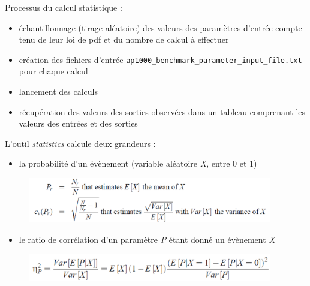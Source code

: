\begin{frame}[fragile]


Processus du calcul statistique : 
\begin{itemize}
    \item échantillonnage (tirage aléatoire) des valeurs des paramètres d'entrée compte tenu de leur loi de pdf et du nombre de calcul à effectuer
    \item création des fichiers d'entrée \texttt{ap1000\_benchmark\_parameter\_input\_file.txt} pour chaque calcul
    \item lancement des calculs
    \item récupération des valeurs des sorties observées dans un tableau comprenant les valeurs des entrées et des sorties
\end{itemize}



\end{frame}


\begin{frame}[fragile]
L'outil \textit{statistics} calcule deux grandeurs :
\begin{itemize}
    \item la probabilité d'un évènement (variable aléatoire \textit{X}, entre 0 et 1)
\end{itemize}
\begin{figure}
\centering \includegraphics[width=0.95\textwidth]{Figures/Stat_EventProba.png} 
\end{figure}

\begin{itemize}
    \item le ratio de corrélation d'un paramètre \textit{P} étant donné un évènement \textit{X}
\end{itemize}
\begin{figure}
\centering \includegraphics[width=0.95\textwidth]{Figures/Stat_CorrelationRatio.png} 
\end{figure}



\end{frame}


